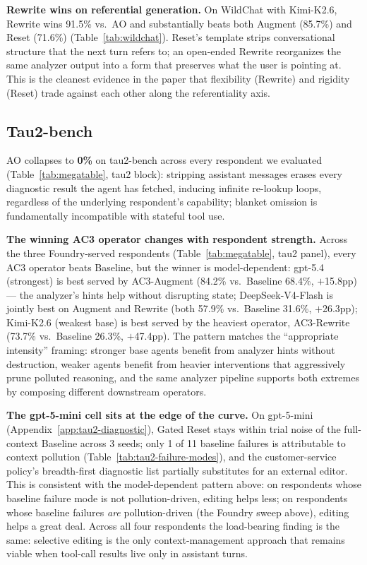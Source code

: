 \documentclass{article}
\begin{document}
\noindent\textbf{Rewrite wins on referential generation.}
On WildChat with Kimi-K2.6, Rewrite wins 91.5\% vs.\ AO and substantially beats both Augment (85.7\%) and Reset (71.6\%) (Table~\ref{tab:wildchat}). Reset's template strips conversational structure that the next turn refers to; an open-ended Rewrite reorganizes the same analyzer output into a form that preserves what the user is pointing at. This is the cleanest evidence in the paper that flexibility (Rewrite) and rigidity (Reset) trade against each other along the referentiality axis.


\subsection{Tau2-bench}
\label{sec:tau2-results}

AO collapses to \textbf{0\%} on tau2-bench across every respondent we evaluated (Table~\ref{tab:megatable}, tau2 block): stripping assistant messages erases every diagnostic result the agent has fetched, inducing infinite re-lookup loops, regardless of the underlying respondent's capability; blanket omission is fundamentally incompatible with stateful tool use.

\noindent\textbf{The winning AC3 operator changes with respondent strength.} Across the three Foundry-served respondents (Table~\ref{tab:megatable}, tau2 panel), every AC3 operator beats Baseline, but the winner is model-dependent: gpt-5.4 (strongest) is best served by AC3-Augment (84.2\% vs.\ Baseline 68.4\%, $+$15.8pp) --- the analyzer's hints help without disrupting state; DeepSeek-V4-Flash is jointly best on Augment and Rewrite (both 57.9\% vs.\ Baseline 31.6\%, $+$26.3pp); Kimi-K2.6 (weakest base) is best served by the heaviest operator, AC3-Rewrite (73.7\% vs.\ Baseline 26.3\%, $+$47.4pp). The pattern matches the ``appropriate intensity'' framing: stronger base agents benefit from analyzer hints without destruction, weaker agents benefit from heavier interventions that aggressively prune polluted reasoning, and the same analyzer pipeline supports both extremes by composing different downstream operators.

\noindent\textbf{The gpt-5-mini cell sits at the edge of the curve.} On gpt-5-mini (Appendix~\ref{app:tau2-diagnostic}), Gated Reset stays within trial noise of the full-context Baseline across 3 seeds; only 1 of 11 baseline failures is attributable to context pollution (Table~\ref{tab:tau2-failure-modes}), and the customer-service policy's breadth-first diagnostic list partially substitutes for an external editor. This is consistent with the model-dependent pattern above: on respondents whose baseline failure mode is not pollution-driven, editing helps less; on respondents whose baseline failures \emph{are} pollution-driven (the Foundry sweep above), editing helps a great deal. Across all four respondents the load-bearing finding is the same: selective editing is the only context-management approach that remains viable when tool-call results live only in assistant turns.
\end{document}
